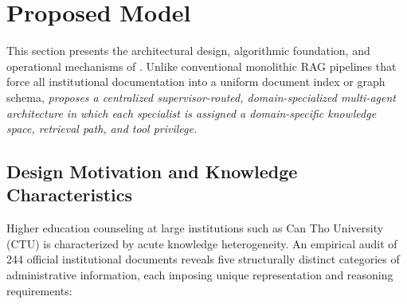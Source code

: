 \section{Proposed Model}
\label{sec:model}

This section presents the architectural design, algorithmic foundation, and operational mechanisms of \system{}. Unlike conventional monolithic RAG pipelines that force all institutional documentation into a uniform document index or graph schema, \emph{\system{} proposes a centralized supervisor-routed, domain-specialized multi-agent architecture in which each specialist is assigned a domain-specific knowledge space, retrieval path, and tool privilege.}

\subsection{Design Motivation and Knowledge Characteristics}
\label{sec:taxonomy}

Higher education counseling at large institutions such as Can Tho University (CTU) is characterized by acute knowledge heterogeneity. An empirical audit of 244 official institutional documents reveals five structurally distinct categories of administrative information, each imposing unique representation and reasoning requirements:

